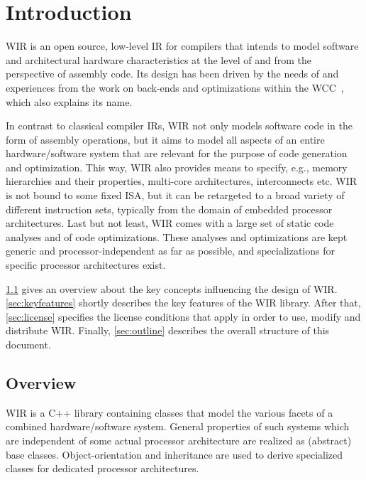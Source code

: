 \chapter{Introduction}
\label{chap:introduction}
\renewcommand{\sectiontitle}{}

\gls{WIR} is an open source, low-level \gls{IR} for compilers that intends to model software and architectural hardware characteristics at the level of and from the perspective of assembly code.
Its design has been driven by the needs of and experiences from the work on back-ends and optimizations within the \gls{WCC}~\cite{FaLo10,wcc26}, which also explains its name.

In contrast to classical compiler \glspl{IR}, \gls{WIR} not only models software code in the form of assembly operations, but it aims to model all aspects of an entire hardware/software system that are relevant for the purpose of code generation and optimization.
This way, \gls{WIR} also provides means to specify, e.g., memory hierarchies and their properties, multi-core architectures, interconnects etc.
\gls{WIR} is not bound to some fixed \gls{ISA}, but it can be retargeted to a broad variety of different instruction sets, typically from the domain of embedded processor architectures.
Last but not least, \gls{WIR} comes with a large set of static code analyses and of code optimizations.
These analyses and optimizations are kept generic and processor-independent as far as possible, and specializations for specific processor architectures exist.

\cref{sec:overview} gives an overview about the key concepts influencing the design of \gls{WIR}.
\cref{sec:keyfeatures} shortly describes the key features of the \gls{WIR} library.
After that, \cref{sec:license} specifies the license conditions that apply in order to use, modify and distribute \gls{WIR}.
Finally, \cref{sec:outline} describes the overall structure of this document.


\section{Overview}
\label{sec:overview}

\gls{WIR} is a C++ library containing classes that model the various facets of a combined hardware/software system.
General properties of such systems which are independent of some actual processor architecture are realized as (abstract) base classes. Object-orientation and inheritance are used to derive specialized classes for dedicated processor architectures.

